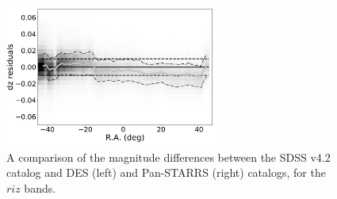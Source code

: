 \documentclass[fleqn,usenatbib]{mnras}
\begin{document}
\begin{figure}
    \centering\includegraphics[width=7cm]{figures/colorResidPSDR2v42bright_dz_RA_Hess.png}
\caption{A comparison of the magnitude differences between the SDSS v4.2 catalog
and DES (left) and Pan-STARRS (right) catalogs, for the $riz$ bands.}
\label{fig:DESPSRA}
\end{figure}
\end{document}
